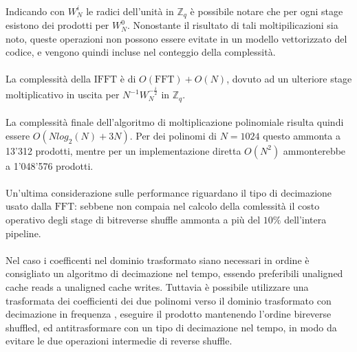 \\
Indicando con $W^i_N$ le radici dell'unità in $\mathbb{Z}_q$ è possibile notare
che per ogni stage esistono dei prodotti per $W^0_N$. Nonostante il risultato
di tali moltipilicazioni sia noto, queste operazioni non possono essere evitate
in un modello vettorizzato del codice, e vengono quindi incluse nel conteggio
della complessità.\\
\pagebreak
\\
La complessità della $\mathrm{IFFT}$ è di $O(\mathrm{FFT}) + O(N)$, dovuto ad
un ulteriore stage moltiplicativo in uscita per $N^{-1} W_N^{-\frac{i}{2}}$ in
$\mathbb{Z}_q$.\\
\\
La complessità finale dell'algoritmo di moltiplicazione polinomiale risulta
quindi essere $O(Nlog_2(N) + 3N)$. Per dei polinomi di $N=1024$ questo
ammonta a 13'312 prodotti, mentre per un implementazione diretta $O(N^2)$
ammonterebbe a 1'048'576 prodotti.\\
\\
Un'ultima considerazione sulle performance riguardano il tipo di decimazione
usato dalla $\mathrm{FFT}$: sebbene non compaia nel calcolo della comlessità il costo
operativo degli stage di bitreverse shuffle ammonta a più del $10\%$
dell'intera pipeline.\\
\\
Nel caso i coefficenti nel dominio trasformato siano necessari in ordine è
consigliato un algoritmo di decimazione nel tempo, essendo preferibili
unaligned cache reads a unaligned cache writes. Tuttavia è possibile utilizzare
una trasformata dei coefficienti dei due polinomi verso il dominio trasformato
con decimazione in frequenza , eseguire il prodotto mantenendo l'ordine
bireverse shuffled, ed antitrasformare con un tipo di decimazione nel tempo, in
modo da evitare le due operazioni intermedie di reverse shuffle.
\pagebreak
